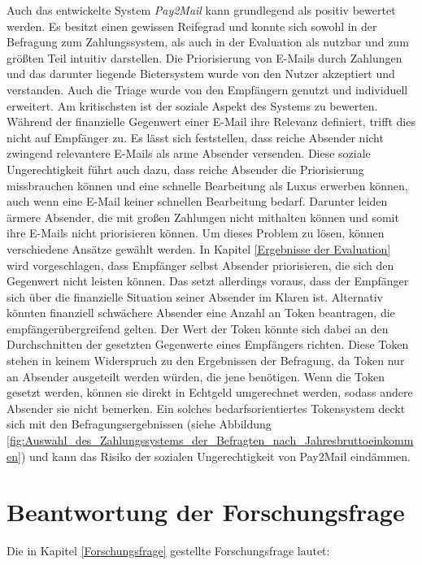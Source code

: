 Auch das entwickelte System \textit{Pay2Mail} kann grundlegend als positiv bewertet werden. Es besitzt einen gewissen Reifegrad und konnte sich sowohl in der Befragung zum Zahlungssystem, als auch in der Evaluation als nutzbar und zum größten Teil intuitiv darstellen. Die Priorisierung von E-Mails durch Zahlungen und das darunter liegende Bietersystem wurde von den Nutzer akzeptiert und verstanden. Auch die Triage wurde von den Empfängern genutzt und individuell erweitert. Am kritischsten ist der soziale Aspekt des Systems zu bewerten. Während der finanzielle Gegenwert einer E-Mail ihre Relevanz definiert, trifft dies nicht auf Empfänger zu. Es lässt sich feststellen, dass reiche Absender nicht zwingend relevantere E-Mails als arme Absender versenden. Diese soziale Ungerechtigkeit führt auch dazu, dass reiche Absender die Priorisierung missbrauchen können und eine schnelle Bearbeitung als Luxus erwerben können, auch wenn eine E-Mail keiner schnellen Bearbeitung bedarf. Darunter leiden ärmere Absender, die mit großen Zahlungen nicht mithalten können und somit ihre E-Mails nicht priorisieren können. Um dieses Problem zu lösen, können verschiedene Ansätze gewählt werden. In Kapitel \ref{Ergebnisse der Evaluation} wird vorgeschlagen, dass Empfänger selbst Absender priorisieren, die sich den Gegenwert nicht leisten können. Das setzt allerdings voraus, dass der Empfänger sich über die finanzielle Situation seiner Absender im Klaren ist. Alternativ könnten finanziell schwächere Absender eine Anzahl an Token beantragen, die empfängerübergreifend gelten. Der Wert der Token könnte sich dabei an den Durchschnitten der gesetzten Gegenwerte eines Empfängers richten. Diese Token stehen in keinem Widerspruch zu den Ergebnissen der Befragung, da Token nur an Absender ausgeteilt werden würden, die jene benötigen. Wenn die Token gesetzt werden, können sie direkt in Echtgeld umgerechnet werden, sodass andere Absender sie nicht bemerken. Ein solches bedarfsorientiertes Tokensystem deckt sich mit den Befragungsergebnissen (siehe Abbildung \ref{fig:Auswahl_des_Zahlungssystems_der_Befragten_nach_Jahresbruttoeinkommen}) und kann das Risiko der sozialen Ungerechtigkeit von Pay2Mail eindämmen.

\section{Beantwortung der Forschungsfrage}
\label{Beantwortung_der_Forschungsfrage}
Die in Kapitel \ref{Forschungsfrage} gestellte Forschungsfrage lautet:

